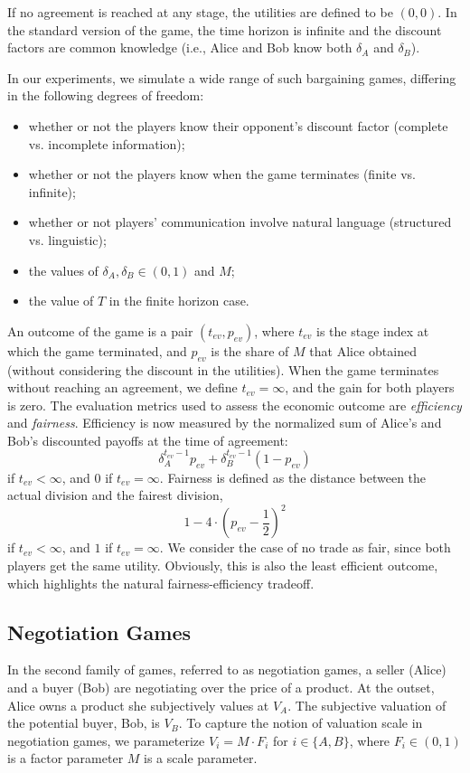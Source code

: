 If no agreement is reached at any stage, the utilities are defined to be $(0,0)$. In the standard version of the game, the time horizon is infinite and the discount factors are common knowledge (i.e., Alice and Bob know both $\delta_A$ and $\delta_B$). 

In our experiments, we simulate a wide range of such bargaining games, differing in the following degrees of freedom: 
\begin{itemize}
     

\item[(i)] whether or not the players know their opponent's discount factor (complete vs. incomplete information);
\item[(ii)] whether or not the players know when the game terminates (finite vs. infinite);
\item[(iii)] whether or not players' communication involve natural language (structured vs. linguistic);
\item[(iv)] the values of $\delta_A, \delta_B \in (0,1)$ and $M$;
\item[(v)] the value of $T$ in the finite horizon case.
\end{itemize}

An outcome of the game is a pair $(t_{ev}, p_{ev})$, where $t_{ev}$ is the stage index at which the game terminated, and $p_{ev}$ is the share of $M$ that Alice obtained (without considering the discount in the utilities).
When the game terminates without reaching an agreement, we define $t_{ev}=\infty$, and the gain for both players is zero.
The evaluation metrics used to assess the economic outcome are \emph{efficiency} and \emph{fairness}. 
Efficiency is now measured by the normalized sum of Alice’s and Bob’s discounted payoffs at the time of agreement: 
\[\delta_A^{t_{ev}-1} p_{ev} + \delta_B^{t_{ev}-1} (1 - p_{ev})\] 
if $t_{ev} < \infty$, and $0$ if $t_{ev} = \infty$. 
Fairness is defined as the distance between the actual division and the fairest division, 
\[1 - 4 \cdot(p_{ev} - \frac{1}{2})^2\] if $t_{ev} < \infty$, and $1$ if $t_{ev} = \infty$. We consider the case of no trade as fair, since both players get the same utility. Obviously, this is also the least efficient outcome, which highlights the natural fairness-efficiency tradeoff.

\subsection{Negotiation Games}

In the second family of games, referred to as negotiation games, a seller (Alice) and a buyer (Bob) are negotiating over the price of a product. 
At the outset, Alice owns a product she subjectively values at $V_A$. The subjective valuation of the potential buyer, Bob, is $V_B$. 
To capture the notion of valuation scale in negotiation games, we parameterize $V_i=M \cdot F_i$ for $i \in \{A,B\}$, where $F_i \in (0, 1)$ is a factor parameter $M$ is a scale parameter.

